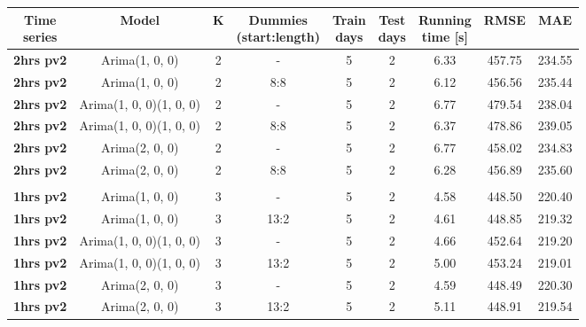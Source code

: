 \documentclass[12pt,a4paper,titlepage]{report}
\begin{document}
\begin{table}[htbp]
    \begin{tabular}{|c|c|c|c|c|c|c|c|c|}
        \hline
        \makecell{\textbf{Time} \\ \textbf{series}} & \textbf{Model}          & \textbf{K} & \makecell{\textbf{Dummies} \\ \textbf{(start:length)}} & \makecell{\textbf{Train} \\ \textbf{days}} & \makecell{\textbf{Test}\\ \textbf{days}} & \makecell{\textbf{Running} \\ \textbf{time {[}s{]}}} & \textbf{RMSE} & \textbf{MAE} \\ \hline
        \textbf{2hrs pv2} & Arima(1, 0, 0)          & 2 & -    & 5 & 2 & 6.33     & 457.75 & 234.55 \\ \hline
        \textbf{2hrs pv2} & Arima(1, 0, 0)          & 2 & 8:8  & 5 & 2 & 6.12     & 456.56 & 235.44 \\ \hline
        \textbf{2hrs pv2} & Arima(1, 0, 0)(1, 0, 0) & 2 & -    & 5 & 2 & 6.77     & 479.54 & 238.04 \\ \hline
        \textbf{2hrs pv2} & Arima(1, 0, 0)(1, 0, 0) & 2 & 8:8  & 5 & 2 & 6.37     & 478.86 & 239.05 \\ \hline
        \textbf{2hrs pv2} & Arima(2, 0, 0)          & 2 & -    & 5 & 2 & 6.77     & 458.02 & 234.83 \\ \hline
        \textbf{2hrs pv2} & Arima(2, 0, 0)          & 2 & 8:8  & 5 & 2 & 6.28     & 456.89 & 235.60 \\ \hline
        \textbf{}         &                         &   &      &   &   &          &        &        \\ \hline
        \textbf{1hrs pv2} & Arima(1, 0, 0)          & 3 & -    & 5 & 2 & 4.58     & 448.50 & 220.40 \\ \hline
        \textbf{1hrs pv2} & Arima(1, 0, 0)          & 3 & 13:2 & 5 & 2 & 4.61     & 448.85 & 219.32 \\ \hline
        \textbf{1hrs pv2} & Arima(1, 0, 0)(1, 0, 0) & 3 & -    & 5 & 2 & 4.66     & 452.64 & 219.20 \\ \hline
        \textbf{1hrs pv2} & Arima(1, 0, 0)(1, 0, 0) & 3 & 13:2 & 5 & 2 & 5.00     & 453.24 & 219.01 \\ \hline
        \textbf{1hrs pv2} & Arima(2, 0, 0)          & 3 & -    & 5 & 2 & 4.59     & 448.49 & 220.30 \\ \hline
        \textbf{1hrs pv2} & Arima(2, 0, 0)          & 3 & 13:2 & 5 & 2 & 5.11     & 448.91 & 219.54 \\ \hline

\end{tabular}
\end{table}
\end{document}
